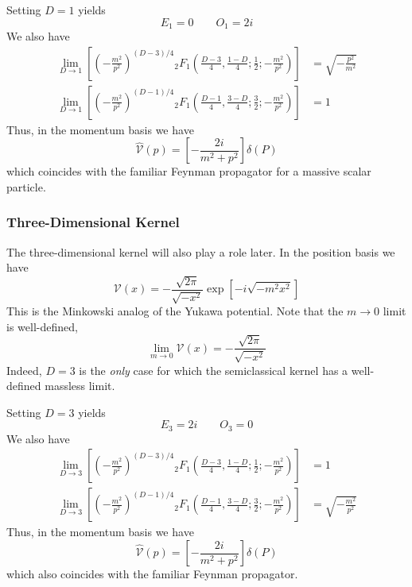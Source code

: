 Setting $D = 1$ yields
\begin{equation}
	E_{1} = 0  \qquad O_{1} = 2i
\end{equation}
We also have
\begin{align}
	\lim_{D \rightarrow 1} \left[ \left(- \frac{m^{2}}{p^{2}} \right)^{(D - 3)/4} {}_{2} F_{1} \left( \frac{D - 3}{4}, \frac{1 - D}{4}; \frac{1}{2}; - \frac{m^{2}}{p^{2}}  \right) \right] &= \sqrt{- \frac{p^{2}}{m^{2}}} \\
	\lim_{D \rightarrow 1} \left[ \left(- \frac{m^{2}}{p^{2}} \right)^{(D - 1)/4} {}_{2} F_{1} \left( \frac{D - 1}{4}, \frac{3 - D}{4}; \frac{3}{2}; - \frac{m^{2}}{p^{2}}  \right) \right] &= 1
\end{align}
Thus, in the momentum basis we have
\begin{equation}
	\widehat{\mathcal{V}}(p) = \left[ -\frac{2i}{m^{2} + p^{2}} \right] \delta(P)
\end{equation}
which coincides with the familiar Feynman propagator for a massive scalar particle.
\subsubsection{Three-Dimensional Kernel}
The three-dimensional kernel will also play a role later. In the position basis we have
\begin{equation}
	\mathcal{V}(x) = - \frac{\sqrt{2 \pi} }{\sqrt{- x^{2}}} \exp{\left[ - i \sqrt{- m^{2} x^{2}} \right]} \label{VleckPropaX3}
\end{equation}
This is the Minkowski analog of the Yukawa potential. Note that the $m \rightarrow 0$ limit is well-defined,
\begin{equation}
	\lim_{m \rightarrow 0} \mathcal{V}(x) = - \frac{\sqrt{2 \pi} }{\sqrt{- x^{2}}} \label{VleckX3M0}
\end{equation}
Indeed, $D = 3$ is the \textit{only} case for which the semiclassical kernel has a well-defined massless limit.

Setting $D = 3$ yields
\begin{equation}
	E_{3} = 2i \qquad O_{3} = 0
\end{equation}
We also have
\begin{align}
	\lim_{D \rightarrow 3} \left[ \left(- \frac{m^{2}}{p^{2}} \right)^{(D - 3)/4} {}_{2} F_{1} \left( \frac{D - 3}{4}, \frac{1 - D}{4}; \frac{1}{2}; - \frac{m^{2}}{p^{2}}  \right) \right] &= 1 \\
	\lim_{D \rightarrow 3} \left[ \left(- \frac{m^{2}}{p^{2}} \right)^{(D - 1)/4} {}_{2} F_{1} \left( \frac{D - 1}{4}, \frac{3 - D}{4}; \frac{3}{2}; - \frac{m^{2}}{p^{2}}  \right) \right] &= \sqrt{- \frac{m^{2}}{p^{2}}}
\end{align}
Thus, in the momentum basis we have
\begin{equation}
	\widehat{\mathcal{V}}(p) = \left[ -\frac{2i}{m^{2} + p^{2}} \right] \delta(P)
\end{equation}
which also coincides with the familiar Feynman propagator.
